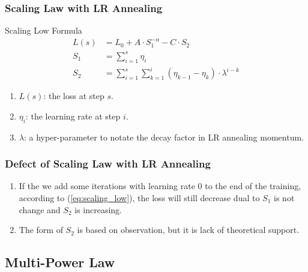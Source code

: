 \documentclass[aspectratio=169]{beamer}
\begin{document}
\begin{frame}
    \frametitle{Scaling Law with LR Annealing}
    \begin{block}{Scaling Low Formula}
        \begin{equation}
            \label{eq:scaling_low}
            \begin{aligned}
                L(s) &= L_0 + A\cdot S_1^{-\alpha} - C\cdot S_2 \\
                S_1 &= \sum_{i=1}^{s} \eta_i \\
                S_2 &= \sum_{i=1}^{s} \sum_{k=1}^{i} (\eta_{k-1} -
                \eta_k)\cdot\lambda^{i-k}
            \end{aligned}
        \end{equation}
    \end{block}

    \begin{enumerate}
        \item $L(s)$: the loss at step $s$.
        \item $\eta_i$: the learning rate at step $i$.
        \item $\lambda$: a hyper-parameter to notate the decay factor
            in LR annealing momentum.
    \end{enumerate}
\end{frame}

\begin{frame}
    \frametitle{Defect of Scaling Law with LR Annealing}
    \begin{enumerate}
        \item If the we add some iterations with learning rate 0 to
            the end of the training, according to
            (\ref{eq:scaling_low}), the loss will still decrease dual
            to $S_1$ is not change and $S_2$ is increasing.
        \item The form of $S_2$ is based on observation, but it is lack of
            theoretical support.
    \end{enumerate}
\end{frame}

\subsection{Multi-Power Law}\label{subsec:MPL}
\end{document}
